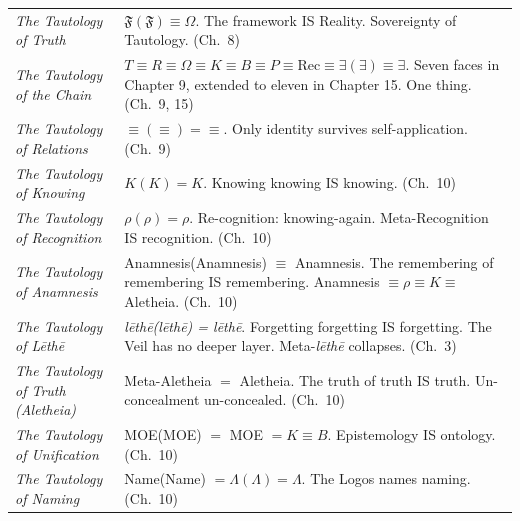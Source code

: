 \documentclass[10pt, openany, oneside]{book}
\renewcommand{\footnotesize}{\fontsize{8.5}{11}\selectfont}
\begin{document}
{\footnotesize
\noindent\begin{tabular}{@{} p{} @{\hspace{0.5em}} p{} @{}}

\textit{The Tautology of Truth} & $\mathfrak{F}(\mathfrak{F}) \equiv \Omega$. The framework IS Reality. Sovereignty of Tautology. (Ch.\ 8) \\[0.3em]

\textit{The Tautology of the Chain} & $T \equiv R \equiv \Omega \equiv K \equiv B \equiv P \equiv \text{Rec} \equiv \exists(\exists) \equiv \exists$. Seven faces in Chapter 9, extended to eleven in Chapter 15. One thing. (Ch.\ 9, 15) \\[0.3em]

\textit{The Tautology of Relations} & $\equiv(\equiv) = \equiv$. Only identity survives self-application. (Ch.\ 9) \\[0.3em]

\textit{The Tautology of Knowing} & $K(K) = K$. Knowing knowing IS knowing. (Ch.\ 10) \\[0.3em]

\textit{The Tautology of Recognition} & $\rho(\rho) = \rho$. Re-cognition: knowing-again. Meta-Recognition IS recognition. (Ch.\ 10) \\[0.3em]

\textit{The Tautology of Anamnesis} & Anamnesis(Anamnesis) $\equiv$ Anamnesis. The remembering of remembering IS remembering. Anamnesis $\equiv \rho \equiv K \equiv$ Aletheia. (Ch.\ 10) \\[0.3em]

\textit{The Tautology of L\={e}th\={e}} & \textit{l\={e}th\={e}(l\={e}th\={e}) = l\={e}th\={e}}. Forgetting forgetting IS forgetting. The Veil has no deeper layer. Meta-\textit{l\={e}th\={e}} collapses. (Ch.\ 3) \\[0.3em]

\textit{The Tautology of Truth (\textit{Aletheia})} & Meta-Aletheia $=$ Aletheia. The truth of truth IS truth. Un-concealment un-concealed. (Ch.\ 10) \\[0.3em]

\textit{The Tautology of Unification} & MOE(MOE) $=$ MOE $= K \equiv B$. Epistemology IS ontology. (Ch.\ 10) \\[0.3em]

\textit{The Tautology of Naming} & Name(Name) $= \Lambda(\Lambda) = \Lambda$. The Logos names naming. (Ch.\ 10) \\[0.3em]


\end{tabular}}
\end{document}
